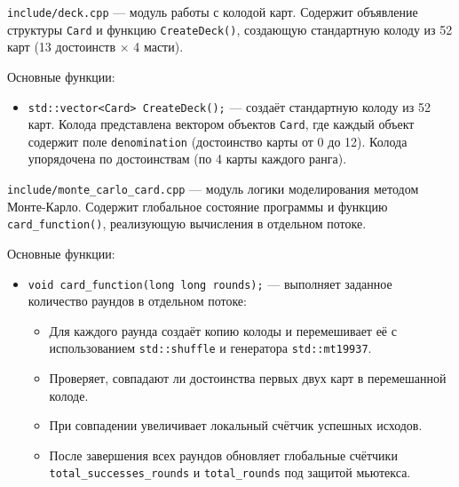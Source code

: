 \texttt{include/deck.cpp} --- модуль работы с колодой карт. Содержит объявление структуры \texttt{Card} и функцию \texttt{CreateDeck()}, создающую стандартную колоду из 52 карт (13 достоинств × 4 масти).

Основные функции:
\begin{itemize} 
    \item \texttt{std::vector<Card> CreateDeck();} --- создаёт стандартную колоду из 52 карт. Колода представлена вектором объектов \texttt{Card}, где каждый объект содержит поле \texttt{denomination} (достоинство карты от 0 до 12). Колода упорядочена по достоинствам (по 4 карты каждого ранга).
\end{itemize}

\texttt{include/monte\_carlo\_card.cpp} --- модуль логики моделирования методом Монте-Карло. Содержит глобальное состояние программы и функцию \texttt{card\_function()}, реализующую вычисления в отдельном потоке.

Основные функции:
\begin{itemize} 
    \item \texttt{void card\_function(long long rounds);} --- выполняет заданное количество раундов в отдельном потоке:
    \begin{itemize}
        \item Для каждого раунда создаёт копию колоды и перемешивает её с использованием \texttt{std::shuffle} и генератора \texttt{std::mt19937}.
        \item Проверяет, совпадают ли достоинства первых двух карт в перемешанной колоде.
        \item При совпадении увеличивает локальный счётчик успешных исходов.
        \item После завершения всех раундов обновляет глобальные счётчики\\ \texttt{total\_successes\_rounds} и \texttt{total\_rounds} под защитой мьютекса.
    \end{itemize}
\end{itemize}
